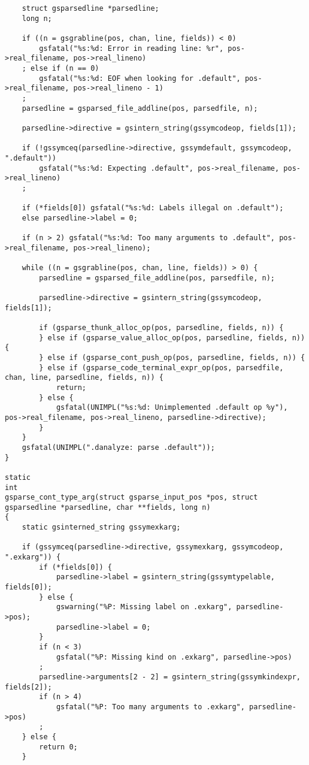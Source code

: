 \documentclass{report}
\begin{document}
\begin{verbatim}
    struct gsparsedline *parsedline;
    long n;

    if ((n = gsgrabline(pos, chan, line, fields)) < 0)
        gsfatal("%s:%d: Error in reading line: %r", pos->real_filename, pos->real_lineno)
    ; else if (n == 0)
        gsfatal("%s:%d: EOF when looking for .default", pos->real_filename, pos->real_lineno - 1)
    ;
    parsedline = gsparsed_file_addline(pos, parsedfile, n);

    parsedline->directive = gsintern_string(gssymcodeop, fields[1]);

    if (!gssymceq(parsedline->directive, gssymdefault, gssymcodeop, ".default"))
        gsfatal("%s:%d: Expecting .default", pos->real_filename, pos->real_lineno)
    ;

    if (*fields[0]) gsfatal("%s:%d: Labels illegal on .default");
    else parsedline->label = 0;

    if (n > 2) gsfatal("%s:%d: Too many arguments to .default", pos->real_filename, pos->real_lineno);

    while ((n = gsgrabline(pos, chan, line, fields)) > 0) {
        parsedline = gsparsed_file_addline(pos, parsedfile, n);

        parsedline->directive = gsintern_string(gssymcodeop, fields[1]);

        if (gsparse_thunk_alloc_op(pos, parsedline, fields, n)) {
        } else if (gsparse_value_alloc_op(pos, parsedline, fields, n)) {
        } else if (gsparse_cont_push_op(pos, parsedline, fields, n)) {
        } else if (gsparse_code_terminal_expr_op(pos, parsedfile, chan, line, parsedline, fields, n)) {
            return;
        } else {
            gsfatal(UNIMPL("%s:%d: Unimplemented .default op %y"), pos->real_filename, pos->real_lineno, parsedline->directive);
        }
    }
    gsfatal(UNIMPL(".danalyze: parse .default"));
}

static
int
gsparse_cont_type_arg(struct gsparse_input_pos *pos, struct gsparsedline *parsedline, char **fields, long n)
{
    static gsinterned_string gssymexkarg;

    if (gssymceq(parsedline->directive, gssymexkarg, gssymcodeop, ".exkarg")) {
        if (*fields[0]) {
            parsedline->label = gsintern_string(gssymtypelable, fields[0]);
        } else {
            gswarning("%P: Missing label on .exkarg", parsedline->pos);
            parsedline->label = 0;
        }
        if (n < 3)
            gsfatal("%P: Missing kind on .exkarg", parsedline->pos)
        ;
        parsedline->arguments[2 - 2] = gsintern_string(gssymkindexpr, fields[2]);
        if (n > 4)
            gsfatal("%P: Too many arguments to .exkarg", parsedline->pos)
        ;
    } else {
        return 0;
    }


\end{verbatim}
\end{document}
